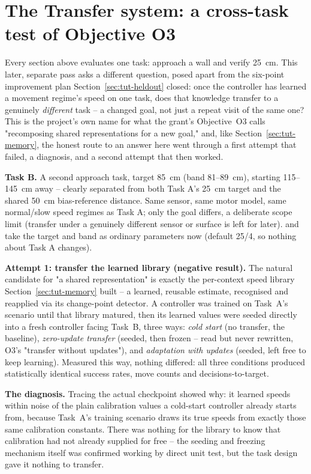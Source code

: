 \documentclass[11pt,a4paper]{article}
\newcommand{\code}[1]{\texttt{\detokenize{#1}}}
\begin{document}
\section{The Transfer system: a cross-task test of Objective O3}
\label{sec:tut-transfer}
Every section above evaluates one task: approach a wall and verify 25~cm. This later,
separate pass asks a different question, posed apart from the six-point improvement
plan Section~\ref{sec:tut-heldout} closed: once the controller has learned a movement
regime's speed on one task, does that knowledge transfer to a genuinely
\emph{different} task -- a changed goal, not just a repeat visit of the same one?
This is the project's own name for what the grant's Objective~O3 calls "recomposing
shared representations for a new goal," and, like Section~\ref{sec:tut-memory}, the
honest route to an answer here went through a first attempt that failed, a diagnosis,
and a second attempt that then worked.

\textbf{Task B.} A second approach task, target 85~cm (band 81--89~cm), starting
115--145~cm away -- clearly separated from both Task A's 25~cm target and the shared
50~cm bias-reference distance. Same sensor, same motor model, same normal/slow speed
regimes as Task A; only the goal differs, a deliberate scope limit (transfer under a
genuinely different sensor or surface is left for later). \code{CognitiveController}
and \code{FairRuleBaseline} take the target and band as ordinary parameters now
(default 25/4, so nothing about Task A changes).

\textbf{Attempt 1: transfer the learned library (negative result).} The natural
candidate for "a shared representation" is exactly the per-context speed library
Section~\ref{sec:tut-memory} built -- a learned, reusable estimate, recognised and
reapplied via its change-point detector. A controller was trained on Task~A's
\code{repeated} scenario until that library matured, then its learned
values were seeded directly into a fresh controller facing Task~B, three ways:
\emph{cold start} (no transfer, the baseline), \emph{zero-update transfer} (seeded,
then frozen -- read but never rewritten, O3's "transfer without updates"), and
\emph{adaptation with updates} (seeded, left free to keep learning). Measured this
way, nothing differed: all three conditions produced statistically identical success
rates, move counts and decisions-to-target.

\textbf{The diagnosis.} Tracing the actual checkpoint showed why: it learned speeds
within noise of the plain calibration values a cold-start controller already starts
from, because Task~A's training scenario draws its true speeds from exactly those
same calibration constants. There was nothing for the library to know that
calibration had not already supplied for free -- the seeding and freezing mechanism
itself was confirmed working by direct unit test, but the task design gave it nothing
to transfer.
\end{document}
